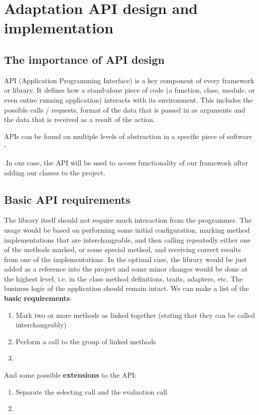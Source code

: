 \chapter{Adaptation API design and implementation}

\section{The importance of API design}

API (Application Programming Interface) is a key component of every framework or library. It defines how a stand-alone piece of code (a function, class, module, or even entire running application) interacts with its environment. This includes the possible calls / requests, format of the data that is passed in as arguments and the data that is received as a result of the action.

APIs can be found on multiple levels of abstraction in a specific piece of software - %

.In our case, the API will be used to access functionality of our framework after adding our classes to the project.

\section{Basic API requirements}

The library itself should not require much interaction from the programmer. The usage would be based on performing some initial configuration, marking method implementations that are interchangeable, and then calling repeatedly either one of the methods marked, or some special method, and receiving correct results from one of the implementations.
In the optimal case, the library would be just added as a reference into the project and some minor changes would be done at the highest level, i.e. in the class method definitions, traits, adapters, etc. The business logic of the application should remain intact.
We can make a list of the \textbf{basic requirements}:
\begin{enumerate}
	\item Mark two or more methods as linked together (stating that they can be called interchangeably)
	\item Perform a call to the group of linked methods
	\item %
\end{enumerate}

And some possible \textbf{extensions} to the API:
\begin{enumerate}
	\item Separate the selecting call and the evaluation call
	\item %
\end{enumerate}

